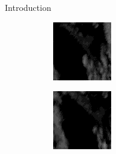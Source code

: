 \documentclass{beamer}
\begin{document}
\begin{frame}{Introduction}
	\begin{figure}
	    \begin{subfigure}{.3\textwidth}
	        \centering
	        \includegraphics[width=\linewidth]{fig/radarcs1801030530.png}
	    \end{subfigure}
	    \begin{subfigure}{.3\textwidth}
	        \centering
	        \includegraphics[width=\linewidth]{fig/radarcs1801030540.png}

\end{subfigure}
\end{figure}
\end{frame}
\end{document}
